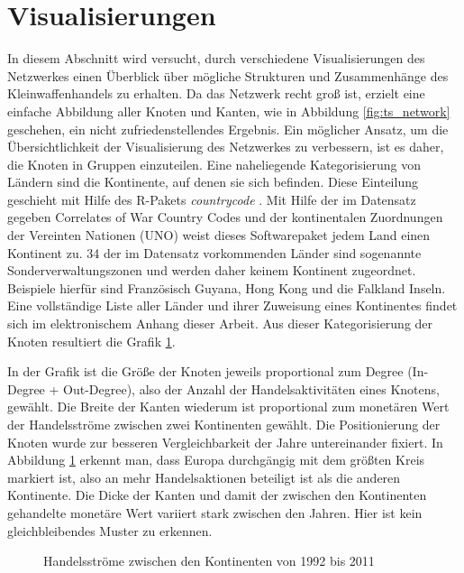 \documentclass[a4paper,ngerman,oneside,titlepage,bibliography=totoc,11pt]{scrreprt}
\begin{document}
\newpage
\section{Visualisierungen}



In diesem Abschnitt wird versucht, durch verschiedene Visualisierungen des Netzwerkes einen Überblick über mögliche Strukturen und Zusammenhänge des Kleinwaffenhandels zu erhalten. Da das Netzwerk recht groß ist, erzielt eine einfache Abbildung aller Knoten und Kanten, wie in Abbildung \ref{fig:ts_network} geschehen, ein nicht zufriedenstellendes Ergebnis. Ein möglicher Ansatz, um die Übersichtlichkeit der Visualisierung des Netzwerkes zu verbessern, ist es daher, die Knoten in Gruppen einzuteilen. Eine naheliegende Kategorisierung von Ländern sind die Kontinente, auf denen sie sich befinden. Diese Einteilung geschieht mit Hilfe des R-Pakets \emph{countrycode} \citep{countrycode}. Mit Hilfe der im Datensatz gegeben Correlates of War Country Codes und der kontinentalen Zuordnungen der Vereinten Nationen (UNO) weist dieses Softwarepaket jedem Land einen Kontinent zu. 34 der im Datensatz vorkommenden Länder sind sogenannte Sonderverwaltungszonen und werden daher keinem Kontinent zugeordnet. Beispiele hierfür sind Französisch Guyana, Hong Kong und die Falkland Inseln. Eine vollständige Liste aller Länder und ihrer Zuweisung eines Kontinentes findet sich im elektronischem Anhang dieser Arbeit.
Aus dieser Kategorisierung der Knoten resultiert die Grafik \ref{fig:cont}. 

In der Grafik ist die Größe der Knoten jeweils proportional zum Degree (In-Degree + Out-Degree), also der Anzahl der Handelsaktivitäten eines Knotens, gewählt. Die Breite der Kanten wiederum ist proportional zum monetären Wert der Handelsströme zwischen zwei Kontinenten gewählt. Die Positionierung der Knoten wurde zur besseren Vergleichbarkeit der Jahre untereinander fixiert.
In Abbildung \ref{fig:cont} erkennt man, dass Europa durchgängig mit dem größten Kreis markiert ist, also an mehr Handelsaktionen beteiligt ist als die anderen Kontinente. Die Dicke der Kanten und damit der zwischen den Kontinenten gehandelte monetäre Wert variiert stark zwischen den Jahren. Hier ist kein gleichbleibendes Muster zu erkennen.

\begin{figure}[ht]
\centering
{}
\caption{Handelsströme zwischen den Kontinenten von 1992 bis 2011}
\label{fig:cont}
\end{figure}
\end{document}
